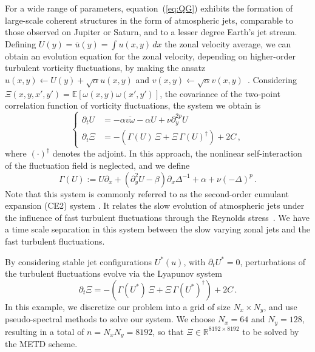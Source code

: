 \documentclass[12pt]{article}
\newcommand{\RR}{\mathds{R}}
\begin{document}
For a wide range of parameters, equation~(\ref{eq:QG}) exhibits the formation of large-scale coherent structures in the form of atmospheric jets, comparable to those observed on Jupiter or Saturn, and to a lesser degree Earth's jet stream. Defining $U(y)=\overline{u}(y) = \int u(x,y)\,dx$ the zonal velocity average, we can obtain an evolution equation for the zonal velocity, depending on higher-order turbulent vorticity fluctuations, by making the ansatz $u(x,y) \leftarrow U(y) + \sqrt{\alpha} u(x,y)$ and $v(x,y) \leftarrow \sqrt{\alpha} v(x,y)$~\cite{bouchet-nardini-tangarife:2013, bouchet-marston-tangarife:2018}. Considering $\Xi(x,y,x',y')={\mathbb{E}}[\omega(x,y)\omega(x',y')]$, the covariance of the two-point correlation function of vorticity fluctuations, the system we obtain is
\begin{equation}
    \begin{cases}
    \partial_t U &=-\alpha \overline{v\omega}   - \alpha U +\nu \partial_y^{2p} U\,\\
    \partial_t \Xi &= -(\Gamma(U) \, \Xi + \Xi \, \Gamma(U)^\dagger) + 2C\,,
    \end{cases}
\end{equation}
where $(\cdot) ^\dagger$ denotes the adjoint. In this approach, the nonlinear self-interaction of the fluctuation field is neglected, and we define
\begin{equation}
    \Gamma(U) := U\partial_x +(\partial_y^2 U-\beta)\partial_x \Delta^{-1} + \alpha + \nu(-\Delta)^p\,.
\end{equation}
Note that this system is commonly referred to as the second-order cumulant expansion (CE2) system \cite{ZonostrophicInstability, StructuralStabilityofTurbulentJets,PhysRevLett.110.224501}. It relates the slow evolution of atmospheric jets under the influence of fast turbulent fluctuations through the Reynolds stress~\cite{bouchet-simonnet:2009, bouchet-rolland-simonnet:2019}. We have a time scale separation in this system between the slow varying zonal jets and the fast turbulent fluctuations.  

By considering stable jet configurations $U^*(u)$, with $\partial_t U^* = 0$, perturbations of the turbulent fluctuations evolve via the Lyapunov system 
\begin{equation}
    \label{dynamicLyapjet}
    \partial_t \Xi = -(\Gamma(U^*) \, \Xi + \Xi \, \Gamma(U^*)^\dagger) + 2C\,.
\end{equation}
In this example, we discretize our problem into a grid of size $N_x \times N_y$, and use pseudo-spectral methods to solve our system. We choose $N_x = 64$ and $N_y=128$, resulting in a total of $n=N_x N_y = 8192$, so that $\Xi \in \RR^{8192\times 8192}$ to be solved by the METD scheme.
\end{document}
